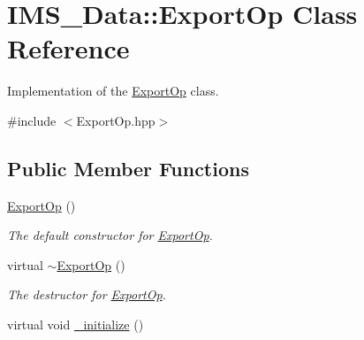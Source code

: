 \hypertarget{classIMS__Data_1_1ExportOp}{
\section{IMS\_\-Data::ExportOp Class Reference}
\label{classIMS__Data_1_1ExportOp}
}


Implementation of the \hyperlink{classIMS__Data_1_1ExportOp}{ExportOp} class.  




{\ttfamily \#include $<$ExportOp.hpp$>$}

\subsection*{Public Member Functions}
\begin{DoxyCompactItemize}
\item 
\hypertarget{classIMS__Data_1_1ExportOp_a32ad5ae844e184b21d176f1c96e2c35d}{
\hyperlink{classIMS__Data_1_1ExportOp_a32ad5ae844e184b21d176f1c96e2c35d}{ExportOp} ()}
\label{classIMS__Data_1_1ExportOp_a32ad5ae844e184b21d176f1c96e2c35d}

\begin{DoxyCompactList}\small\item\em The default constructor for \hyperlink{classIMS__Data_1_1ExportOp}{ExportOp}. \item\end{DoxyCompactList}\item 
\hypertarget{classIMS__Data_1_1ExportOp_adee50f1aebbbd15e9c131261eb896016}{
virtual \hyperlink{classIMS__Data_1_1ExportOp_adee50f1aebbbd15e9c131261eb896016}{$\sim$ExportOp} ()}
\label{classIMS__Data_1_1ExportOp_adee50f1aebbbd15e9c131261eb896016}

\begin{DoxyCompactList}\small\item\em The destructor for \hyperlink{classIMS__Data_1_1ExportOp}{ExportOp}. \item\end{DoxyCompactList}\item 
\hypertarget{classIMS__Data_1_1ExportOp_a8ea1ab73a2f82218b780b555d222a6e4}{
virtual void \hyperlink{classIMS__Data_1_1ExportOp_a8ea1ab73a2f82218b780b555d222a6e4}{\_\-initialize} ()}
\label{classIMS__Data_1_1ExportOp_a8ea1ab73a2f82218b780b555d222a6e4}


\end{DoxyCompactItemize}
